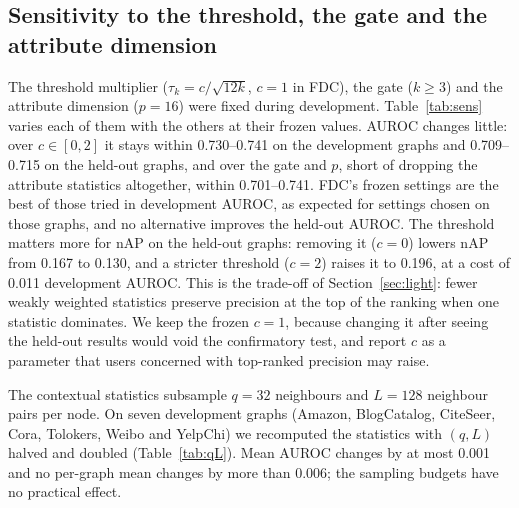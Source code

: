 \documentclass[pdflatex,sn-mathphys-ay]{sn-jnl}
\theoremstyle{plain}
\theoremstyle{remark}
\begin{document}
\subsection{Sensitivity to the threshold, the gate and the attribute dimension}\label{sec:sens}

The threshold multiplier ($\tau_k=c/\sqrt{12k}$, $c=1$ in FDC), the gate ($k\ge3$) and the attribute dimension ($p=16$) were fixed during development. Table~\ref{tab:sens} varies each of them with the others at their frozen values. AUROC changes little: over $c\in[0,2]$ it stays within 0.730--0.741 on the development graphs and 0.709--0.715 on the held-out graphs, and over the gate and $p$, short of dropping the attribute statistics altogether, within 0.701--0.741. FDC's frozen settings are the best of those tried in development AUROC, as expected for settings chosen on those graphs, and no alternative improves the held-out AUROC. The threshold matters more for nAP on the held-out graphs: removing it ($c=0$) lowers nAP from 0.167 to 0.130, and a stricter threshold ($c=2$) raises it to 0.196, at a cost of 0.011 development AUROC. This is the trade-off of Section~\ref{sec:light}: fewer weakly weighted statistics preserve precision at the top of the ranking when one statistic dominates. We keep the frozen $c=1$, because changing it after seeing the held-out results would void the confirmatory test, and report $c$ as a parameter that users concerned with top-ranked precision may raise.

The contextual statistics subsample $q=32$ neighbours and $L=128$ neighbour pairs per node. On seven development graphs (Amazon, BlogCatalog, CiteSeer, Cora, Tolokers, Weibo and YelpChi) we recomputed the statistics with $(q,L)$ halved and doubled (Table~\ref{tab:qL}). Mean AUROC changes by at most 0.001 and no per-graph mean changes by more than 0.006; the sampling budgets have no practical effect.
\end{document}
